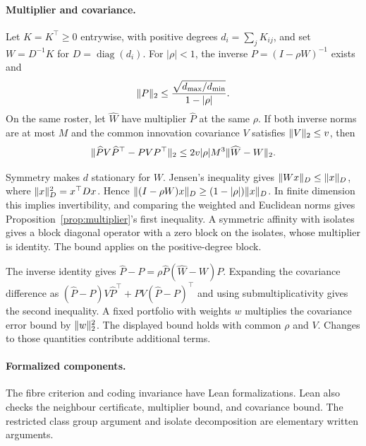 \paragraph{Multiplier and covariance.}
\begin{proposition}
  \label{prop:multiplier}
  Let $K=K^\top\geq 0$ entrywise, with positive degrees $d_i=\sum_j
  K_{ij}$, and set $W=D^{-1}K$ for $D=\operatorname{diag}(d_i)$. For
  $|\rho|<1$, the inverse $P=(I-\rho W)^{-1}$ exists and
  \[
    \lVert P\rVert_2\leq \frac{\sqrt{d_{\max}/d_{\min}}}{1-|\rho|}.
  \]
  On the same roster, let $\widehat W$ have multiplier $\widehat P$
  at the same $\rho$. If both inverse norms are at most $M$ and the
  common innovation covariance $V$ satisfies $\lVert V\rVert_2\leq v$, then
  \[
    \lVert \widehat P V\widehat P^\top-PVP^\top\rVert_2
    \leq 2v|\rho|M^3\lVert \widehat W-W\rVert_2 .
  \]
\end{proposition}
Symmetry makes $d$ stationary for $W$. Jensen's inequality gives
$\lVert Wx\rVert_D\leq\lVert x\rVert_D$, where $\lVert x\rVert_D^2=x^\top Dx$. Hence
$\lVert (I-\rho W)x\rVert_D\geq(1-|\rho|)\lVert x\rVert_D$.
In finite dimension this implies invertibility, and comparing the
weighted and Euclidean norms gives
Proposition~\ref{prop:multiplier}'s first inequality. A symmetric
affinity with isolates gives a block diagonal operator with a zero
block on the isolates, whose multiplier is identity. The bound
applies on the positive-degree block.

The inverse identity gives $\widehat P-P=\rho \widehat P(\widehat
W-W)P$. Expanding the covariance difference as
$(\widehat P-P)V\widehat P^\top+PV(\widehat P-P)^\top$
and using submultiplicativity gives the second inequality. A fixed
portfolio with weights $w$ multiplies the covariance error bound by
$\lVert w\rVert_2^2$. The displayed bound holds with common $\rho$ and $V$.
Changes to those quantities contribute additional terms.

\paragraph{Formalized components.}
The fibre criterion and coding invariance have Lean formalizations.
Lean also checks the neighbour certificate, multiplier bound, and
covariance bound.
The restricted class group argument and isolate decomposition are
elementary written arguments.

